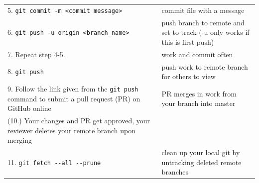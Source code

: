 \documentclass[]{book}
\begin{document}
\begin{longtable}[]{@{}ll@{}}
\begin{minipage}[t]{0.34\columnwidth}\raggedright
5. \texttt{git\ commit\ -m\ \textless{}commit\ message\textgreater{}}\strut
\end{minipage} & \begin{minipage}[t]{0.60\columnwidth}\raggedright
commit file with a message\strut
\end{minipage}\tabularnewline
\begin{minipage}[t]{0.34\columnwidth}\raggedright
6. \texttt{git\ push\ -u\ origin\ \textless{}branch\_name\textgreater{}}\strut
\end{minipage} & \begin{minipage}[t]{0.60\columnwidth}\raggedright
push branch to remote and set to track (-u only works if this is first push)\strut
\end{minipage}\tabularnewline
\begin{minipage}[t]{0.34\columnwidth}\raggedright
7. Repeat step 4-5.\strut
\end{minipage} & \begin{minipage}[t]{0.60\columnwidth}\raggedright
work and commit often\strut
\end{minipage}\tabularnewline
\begin{minipage}[t]{0.34\columnwidth}\raggedright
8. \texttt{git\ push}\strut
\end{minipage} & \begin{minipage}[t]{0.60\columnwidth}\raggedright
push work to remote branch for others to view\strut
\end{minipage}\tabularnewline
\begin{minipage}[t]{0.34\columnwidth}\raggedright
9. Follow the link given from the \texttt{git\ push} command to submit a pull request (PR) on GitHub online\strut
\end{minipage} & \begin{minipage}[t]{0.60\columnwidth}\raggedright
PR merges in work from your branch into master\strut
\end{minipage}\tabularnewline
\begin{minipage}[t]{0.34\columnwidth}\raggedright
(10.) Your changes and PR get approved, your reviewer deletes your remote branch upon merging\strut
\end{minipage} & \begin{minipage}[t]{0.60\columnwidth}\raggedright
\strut
\end{minipage}\tabularnewline
\begin{minipage}[t]{0.34\columnwidth}\raggedright
11. \texttt{git\ fetch\ -\/-all\ -\/-prune}\strut
\end{minipage} & \begin{minipage}[t]{0.60\columnwidth}\raggedright
clean up your local git by untracking deleted remote branches\strut
\end{minipage}\tabularnewline
\bottomrule
\end{longtable}
\end{document}
